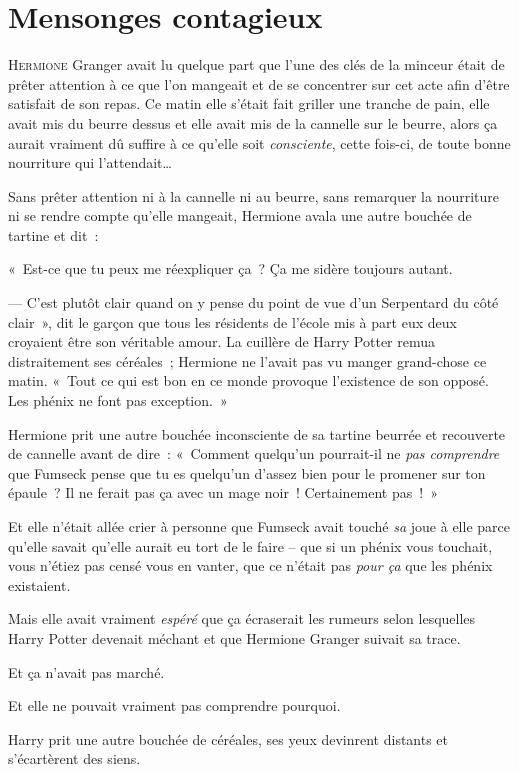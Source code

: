 \chapter{Mensonges contagieux}

\lettrine{H}{ermione} Granger avait lu quelque part que l'une des clés de la minceur était de prêter attention à ce que l'on mangeait et de se concentrer sur cet acte afin d'être satisfait de son repas. Ce matin elle s'était fait griller une tranche de pain, elle avait mis du beurre dessus et elle avait mis de la cannelle sur le beurre, alors ça aurait vraiment dû suffire à ce qu'elle soit \emph{consciente}, cette fois-ci, de toute bonne nourriture qui l'attendait…

Sans prêter attention ni à la cannelle ni au beurre, sans remarquer la nourriture ni se rendre compte qu'elle mangeait, Hermione avala une autre bouchée de tartine et dit~:

«~Est-ce que tu peux me réexpliquer ça~? Ça me sidère toujours autant.

--- C'est plutôt clair quand on y pense du point de vue d'un Serpentard du côté clair~», dit le garçon que tous les résidents de l'école mis à part eux deux croyaient être son véritable amour. La cuillère de Harry Potter remua distraitement ses céréales~; Hermione ne l'avait pas vu manger grand-chose ce matin. «~Tout ce qui est bon en ce monde provoque l'existence de son opposé. Les phénix ne font pas exception.~»

Hermione prit une autre bouchée inconsciente de sa tartine beurrée et recouverte de cannelle avant de dire~: «~Comment quelqu'un pourrait-il ne \emph{pas comprendre} que Fumseck pense que tu es quelqu'un d'assez bien pour le promener sur ton épaule~? Il ne ferait pas ça avec un mage noir~! Certainement pas~!~»

Et elle n'était allée crier à personne que Fumseck avait touché \emph{sa} joue à elle parce qu'elle savait qu'elle aurait eu tort de le faire -- que si un phénix vous touchait, vous n'étiez pas censé vous en vanter, que ce n'était pas \emph{pour ça} que les phénix existaient.

Mais elle avait vraiment \emph{espéré} que ça écraserait les rumeurs selon lesquelles Harry Potter devenait méchant et que Hermione Granger suivait sa trace.

Et ça n'avait pas marché.

Et elle ne pouvait vraiment pas comprendre pourquoi.

Harry prit une autre bouchée de céréales, ses yeux devinrent distants et s'écartèrent des siens.

